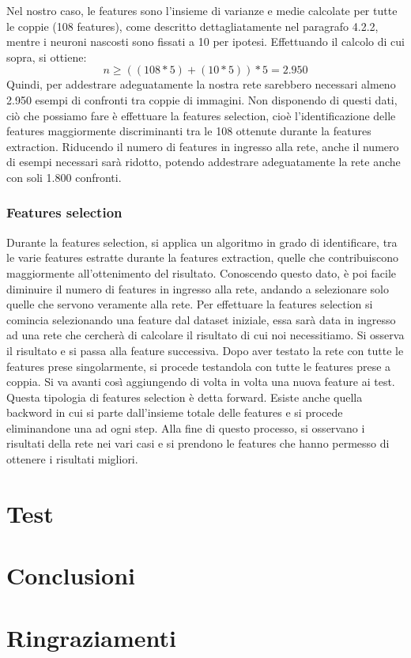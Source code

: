 \documentclass[a4paper,11pt]{article}
\begin{document}
    Nel nostro caso, le features sono l'insieme di varianze e medie calcolate per tutte le coppie (108 features), come descritto dettagliatamente nel paragrafo 4.2.2, mentre i neuroni nascosti sono fissati a 10 per ipotesi.
    Effettuando il calcolo di cui sopra, si ottiene: 
    $$ n \geq ((108*5)+(10*5))*5 = 2.950 $$
    Quindi, per addestrare adeguatamente la nostra rete sarebbero necessari almeno 2.950 esempi di confronti tra coppie di immagini.
    Non disponendo di questi dati, ciò che possiamo fare è effettuare la features selection, cioè l'identificazione delle features maggiormente discriminanti tra le 108 ottenute durante la features extraction.
    Riducendo il numero di features in ingresso alla rete, anche il numero di esempi necessari sarà ridotto, potendo addestrare adeguatamente la rete anche con soli 1.800 confronti.
    \subsubsection{Features selection}
    Durante la features selection, si applica un algoritmo in grado di identificare, tra le varie features estratte durante la features extraction, quelle che contribuiscono maggiormente all'ottenimento del risultato.
    Conoscendo questo dato, è poi facile diminuire il numero di features in ingresso alla rete, andando a selezionare solo quelle che servono veramente alla rete. 
    Per effettuare la features selection si comincia selezionando una feature dal dataset iniziale, essa sarà data in ingresso ad una rete che cercherà di calcolare il risultato di cui noi necessitiamo.
    Si osserva il risultato e si passa alla feature successiva. Dopo aver testato la rete con tutte le features prese singolarmente, si procede testandola con tutte le features prese a coppia. Si va avanti così aggiungendo di volta in volta una nuova feature ai test.
    Questa tipologia di features selection è detta forward. Esiste anche quella backword in cui si parte dall'insieme totale delle features e si procede eliminandone una ad ogni step.
    Alla fine di questo processo, si osservano i risultati della rete nei vari casi e si prendono le features che hanno permesso di ottenere i risultati migliori.
    \newpage
    \section{Test}
    \lipsum[1-3]

    \newpage
    \section{Conclusioni} 
    \lipsum[1-3]

    \newpage
    \section{Ringraziamenti}
    \lipsum[1-3]
    
\end{document}
